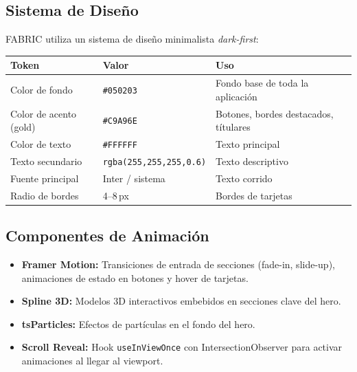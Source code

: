 \documentclass[12pt, a4paper, twoside]{report}
\begin{document}
\subsection{Sistema de Diseño}

FABRIC utiliza un sistema de diseño minimalista \textit{dark-first}:

\begin{center}
\begin{tabular}{L{4cm} L{3.5cm} L{6cm}}
  \toprule
  \textbf{Token} & \textbf{Valor} & \textbf{Uso} \\
  \midrule
  Color de fondo         & \texttt{\#050203} & Fondo base de toda la aplicación \\
  Color de acento (gold) & \texttt{\#C9A96E} & Botones, bordes destacados, títulares \\
  Color de texto         & \texttt{\#FFFFFF} & Texto principal \\
  Texto secundario       & \texttt{rgba(255,255,255,0.6)} & Texto descriptivo \\
  Fuente principal       & Inter / sistema   & Texto corrido \\
  Radio de bordes        & 4--8\,px          & Bordes de tarjetas \\
  \bottomrule
\end{tabular}
\end{center}

\subsection{Componentes de Animación}

\begin{itemize}
  \item \textbf{Framer Motion:} Transiciones de entrada de secciones (fade-in, slide-up),
        animaciones de estado en botones y hover de tarjetas.
  \item \textbf{Spline 3D:} Modelos 3D interactivos embebidos en secciones clave del hero.
  \item \textbf{tsParticles:} Efectos de partículas en el fondo del hero.
  \item \textbf{Scroll Reveal:} Hook \texttt{useInViewOnce} con IntersectionObserver para
        activar animaciones al llegar al viewport.
\end{itemize}

\clearpage
\end{document}
